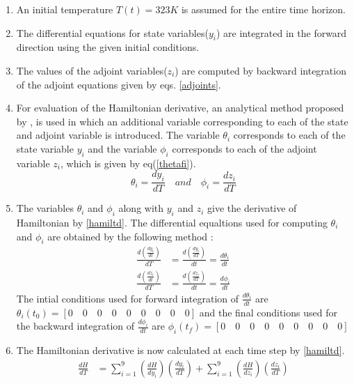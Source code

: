 \documentclass[3p,times,authoryear]{elsarticle}
\begin{document}
\begin{enumerate}
\item An initial temperature $T(t) = 323 K$ is assumed for the entire time horizon.
\item The differential equations for state variables($y_{i}$) are integrated in the forward direction using the given initial conditions.
\item The values of the adjoint variables($z_{i}$) are computed by backward integration of the adjoint equations given by eqs. \ref{adjoints}.
\item For evaluation of the Hamiltonian derivative, an analytical method proposed by \cite{benavides}, is used in which an additional variable corresponding to each of the state and adjoint variable is introduced. The variable $\theta_{i}$ corresponds to each of the state variable $y_{i}$ and the variable $\phi_{i}$ corresponds to each of the adjoint variable $z_{i}$, which is given by eq(\ref{thetafi}).
\begin{equation}
\theta_{i} = \frac{dy_{i}}{dT} \quad and \quad \phi_{i} = \frac{dz_{i}}{dT} \label{thetafi} 
\end{equation}
\item The variables $\theta_{i}$ and $\phi_{i}$ along with $y_{i}$ and $z_{i}$ give the derivative of Hamiltonian by \ref{hamiltd}. The differential equaltions used for computing $\theta_{i}$ and $\phi_{i}$ are obtained by the following method :  
\begin{align}
\frac{d\left( \frac{dy_{i}}{dt}  \right)}{dT} &= \frac{d\left( \frac{dy_{i}}{dT}  \right)}{dt} = \frac{d\theta_{i}}{dt} \label{theta}\\
\frac{d\left( \frac{dz_{i}}{dt}  \right)}{dT} &= \frac{d\left( \frac{dz_{i}}{dT}  \right)}{dt} = \frac{d\phi_{i}}{dt} \label{phi}
\end{align}
The intial conditions used for forward integration of $\frac{d\theta_{i}}{dt}$ are $\theta_{i}(t_{0}) = \left[  0 \quad 0 \quad 0 \quad 0 \quad 0 \quad 0 \quad 0 \quad 0 \quad 0 \right]$ and the final conditions used for the backward integration of $\frac{d\phi_{i}}{dt}$ are $\phi_{i}(t_{f}) = \left[  0 \quad 0 \quad 0 \quad 0 \quad 0 \quad 0 \quad 0 \quad 0 \quad 0 \right]$  
\item The Hamiltonian derivative is now calculated at each time step by \ref{hamiltd}. 
\begin{align}
\frac{dH}{dT} &= \sum_{i=1}^{9} \left( \frac{dH}{dy_{i}}\right)\left(	\frac{dy_{i}}{dT} \right) + \sum_{i=1}^{9} \left(\frac{dH}{dz_{i}}\right)\left(\frac{dz_{i}}{dT} \right) \\

\end{align}
\end{enumerate}
\end{document}
